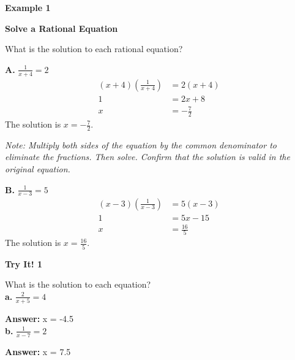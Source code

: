 \documentclass{article}
\newenvironment{example}[1]{\textbf{Example #1}\par}{\vspace{1em}}
\newenvironment{tryit}[1]{\textbf{Try It! #1}\par}{\vspace{1em}}
\newcommand{\answer}[1]{\par\textbf{Answer:} #1}
\begin{document}
\begin{example}{1}
\textbf{Solve a Rational Equation}

What is the solution to each rational equation?

\textbf{A.} $\frac{1}{x+4} = 2$
\begin{align*}
(x+4)\left(\frac{1}{x+4}\right) &= 2(x+4) \\
1 &= 2x + 8 \\
x &= -\frac{7}{2}
\end{align*}
The solution is $x = -\frac{7}{2}$.

\textit{Note: Multiply both sides of the equation by the common denominator to eliminate the fractions. Then solve. Confirm that the solution is valid in the original equation.}

\textbf{B.} $\frac{1}{x-3} = 5$
\begin{align*}
(x-3)\left(\frac{1}{x-3}\right) &= 5(x-3) \\
1 &= 5x - 15 \\
x &= \frac{16}{5}
\end{align*}
The solution is $x = \frac{16}{5}$.
\end{example}

\begin{tryit}{1}
What is the solution to each equation? \\
\textbf{a.} $\frac{2}{x+5} = 4$ \answer{x = -4.5} \\
\textbf{b.} $\frac{1}{x-7} = 2$ \answer{x = 7.5}
\end{tryit}
\end{document}
